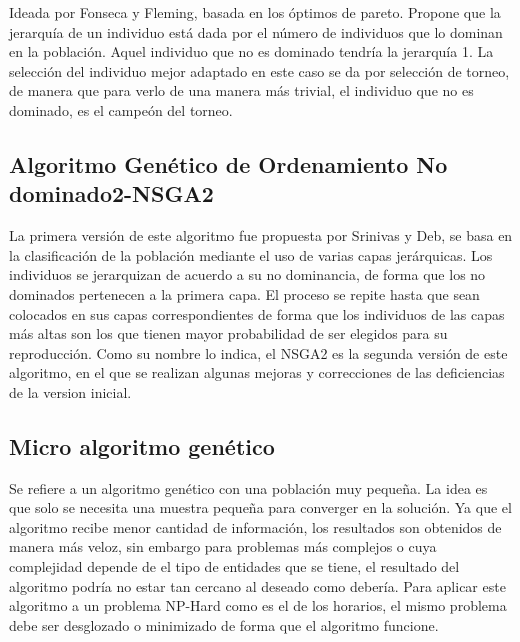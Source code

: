 		Ideada por Fonseca y Fleming, basada en los óptimos de pareto. Propone que la jerarquía de un individuo está dada por el número de individuos que lo dominan en la población. Aquel individuo que no es dominado tendría la jerarquía 1. La selección del individuo mejor adaptado en este caso se da por selección de torneo, de manera que para verlo de una manera más trivial, el individuo que no es dominado, es el campeón del torneo.

		\subsection{Algoritmo Genético de Ordenamiento No dominado2-NSGA2}
		La primera versión de este algoritmo fue propuesta por Srinivas y Deb, se basa en la clasificación de la población mediante el uso de varias capas jerárquicas. Los individuos se jerarquizan de acuerdo a su no dominancia, de forma que los no dominados pertenecen a la primera capa. El proceso se repite hasta que sean colocados en sus capas correspondientes de forma que los individuos de las capas más altas son los que tienen mayor probabilidad de ser elegidos para su reproducción. Como su nombre lo indica, el NSGA2 es la segunda versión de este algoritmo, en el que se realizan algunas mejoras y correcciones de las deficiencias de la version inicial.

		\subsection{Micro algoritmo genético}
		Se refiere a un algoritmo genético con una población muy pequeña. La idea es que solo se necesita una muestra pequeña para converger en la solución. Ya que el algoritmo recibe menor cantidad de información, los resultados son obtenidos de manera más veloz, sin embargo para problemas más complejos o cuya complejidad depende de el tipo de entidades que se tiene, el resultado del algoritmo podría no estar tan cercano al deseado como debería. Para aplicar este algoritmo a un problema NP-Hard como es el de los horarios, el mismo problema debe ser desglozado o minimizado de forma que el algoritmo funcione.